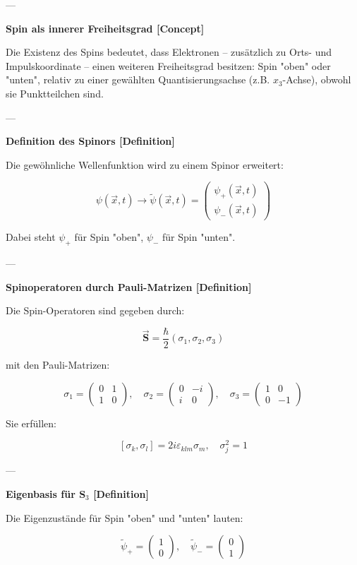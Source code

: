 \documentclass[10pt, letterpaper]{article}
\begin{document}
---

\textbf{Spin als innerer Freiheitsgrad [Concept]}

Die Existenz des Spins bedeutet, dass Elektronen – zusätzlich zu Orts- und Impulskoordinate – einen weiteren Freiheitsgrad besitzen: Spin "oben" oder "unten", relativ zu einer gewählten Quantisierungsachse (z.B. \( x_3 \)-Achse), obwohl sie Punktteilchen sind.

---

\textbf{Definition des Spinors [Definition]}

Die gewöhnliche Wellenfunktion wird zu einem Spinor erweitert:

\[
\psi(\vec{x}, t) \rightarrow \tilde{\psi}(\vec{x}, t)=\begin{pmatrix}\psi_+(\vec{x}, t)\\ \psi_-(\vec{x}, t)\end{pmatrix}
\]

Dabei steht \( \psi_+ \) für Spin "oben", \( \psi_- \) für Spin "unten".

---

\textbf{Spinoperatoren durch Pauli-Matrizen [Definition]}

Die Spin-Operatoren sind gegeben durch:

\[
\vec{\mathbf{S}} = \frac{\hbar}{2} (\sigma_1, \sigma_2, \sigma_3)
\]

mit den Pauli-Matrizen:

\[
\sigma_1 = \begin{pmatrix}0 & 1 \\ 1 & 0\end{pmatrix},\quad
\sigma_2 = \begin{pmatrix}0 & -i \\ i & 0\end{pmatrix},\quad
\sigma_3 = \begin{pmatrix}1 & 0 \\ 0 & -1\end{pmatrix}
\]

Sie erfüllen:

\[
[\sigma_k, \sigma_l] = 2i \varepsilon_{klm} \sigma_m,\quad \sigma_j^2 = 1
\]

---

\textbf{Eigenbasis für \(\mathbf{S}_3\) [Definition]}

Die Eigenzustände für Spin "oben" und "unten" lauten:

\[
\tilde{\psi}_+ = \begin{pmatrix}1 \\ 0\end{pmatrix},\quad
\tilde{\psi}_- = \begin{pmatrix}0 \\ 1\end{pmatrix}
\]
\end{document}
